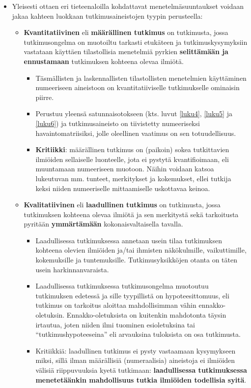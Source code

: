 \documentclass[
]{book}
\providecommand{\tightlist}{%
  \setlength{\itemsep}{0pt}\setlength{\parskip}{0pt}}
\begin{document}
\begin{itemize}
\tightlist
\item
  Yleisesti ottaen eri tieteenaloilla kohdattavat menetelmäsuuntaukset voidaan jakaa kahteen luokkaan tutkimusaineistojen tyypin perusteella:

  \begin{itemize}
  \tightlist
  \item
    \textbf{Kvantitatiivinen} eli \textbf{määrällinen tutkimus} on tutkimusta, jossa tutkimusongelma on muotoiltu tarkasti etukäteen ja tutkimuskysymyksiin vastataan käyttäen tilastollisia menetelmiä pyrkien \textbf{selittämään ja ennustamaan} tutkimuksen kohteena olevaa ilmiötä.

    \begin{itemize}
    \tightlist
    \item
      Täsmällisten ja laskennallisten tilastollisten menetelmien käyttäminen numeeriseen aineistoon on kvantitatiiviselle tutkimukselle ominaisin piirre.
    \item
      Perustuu yleensä satunnaisotokseen (kts. luvut \ref{luku4}, \ref{luku5} ja \ref{luku6}) ja tutkimusaineisto on tiivistetty numeeriseksi havaintomatriisiksi, jolle oleellinen vaatimus on sen totuudellisuus.
    \item
      \textbf{Kritiikki}: määrällinen tutkimus on (paikoin) sokea tutkittavien ilmiöiden sellaiselle luonteelle, jota ei pystytä kvantifioimaan, eli muuntamaan numeeriseen muotoon. Näihin voidaan katsoa lukeutuvan mm. tunteet, merkitykset ja kokemukset, ellei tutkija keksi niiden numeeriselle mittaamiselle uskottavaa keinoa.\\
    \end{itemize}
  \item
    \textbf{Kvalitatiivinen} eli \textbf{laadullinen tutkimus} on tutkimusta, jossa tutkimuksen kohteena olevaa ilmiötä ja sen merkitystä sekä tarkoitusta pyritään \textbf{ymmärtämään} kokonaisvaltaisella tavalla.

    \begin{itemize}
    \tightlist
    \item
      Laadullisessa tutkimuksessa annetaan usein tilaa tutkimuksen kohteena olevien ilmiöiden ja/tai ihmisten näkökulmille, vaikuttimille, kokemuksille ja tuntemuksille. Tutkimusyksikköjen otanta on täten usein harkinnanvaraista.
    \item
      Laadullisessa tutkimuksessa tutkimusongelma muotoutuu tutkimuksen edetessä ja sille tyypillistä on hypoteesittomuus, eli tutkimus on tarkoitus aloittaa mahdollisimman vähin ennakko-oletuksin. Ennakko-oletuksista on kuitenkin mahdotonta täysin irtautua, joten niiden ilmi tuominen esioletuksina tai ``tutkimushypoteeseina'' eli arvauksina tuloksista on osa tutkimusta.
    \item
      Kritiikkiä: laadullinen tutkimus ei pysty vastaamaan kysymykseen miksi, sillä ilman määrällisiä (numeraalisia) aineistoja ei ilmiöiden välisiä riippuvuuksia kyetä tutkimaan: \textbf{laadullisessa tutkimuksessa menetetäänkin mahdollisuus tutkia ilmiöiden todellisia syitä}.


\end{itemize}
\end{itemize}
\end{itemize}
\end{document}
